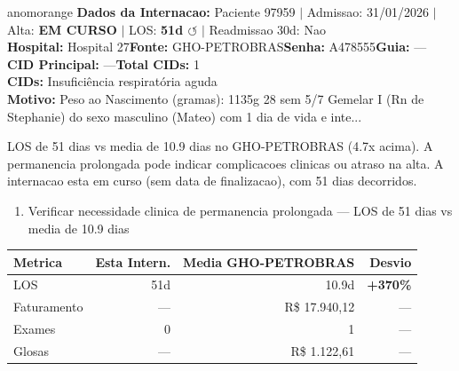 \documentclass[a4paper,10pt]{article}
\begin{document}
\begin{anomalycard}[Internacao 163845 | GHO-PETROBRAS | ALTO (z=4.13)]{anomorange}
\textbf{Dados da Internacao:} Paciente 97959 $\mid$ Admissao: 31/01/2026 $\mid$ Alta: \textcolor{anomorange}{\textbf{EM CURSO}} $\mid$ LOS: \textbf{51d \textcolor{anomorange}{$\circlearrowleft$}} $\mid$ Readmissao 30d: Nao\\
\textbf{Hospital:} Hospital 27\quad\textbf{Fonte:} GHO-PETROBRAS\quad\textbf{Senha:} A478555\quad\textbf{Guia:} ---\\
\textbf{CID Principal:} {\small ---}\quad\textbf{Total CIDs:} 1\\

\textbf{CIDs:} {\scriptsize Insuficiência respiratória aguda}\\

\textbf{Motivo:} {\scriptsize Peso ao Nascimento (gramas): 1135g 28 sem 5/7       Gemelar I (Rn de Stephanie) do sexo masculino (Mateo) com 1 dia de vida e inte...}\\

\vspace{2pt}\begin{tcolorbox}[colback=severityred!20,colframe=anomorange,title={\textbf{Interpretacao de Negocio}},fonttitle=\bfseries\small,left=4pt,right=4pt,top=3pt,bottom=3pt]
{\small LOS de 51 dias vs media de 10.9 dias no GHO-PETROBRAS (4.7x acima). A permanencia prolongada pode indicar complicacoes clinicas ou atraso na alta. A internacao esta em curso (sem data de finalizacao), com 51 dias decorridos.}
\end{tcolorbox}
\begin{tcolorbox}[colback=severityyellow!30,colframe=anomorange,title={\textbf{Recomendacoes Especificas}},fonttitle=\bfseries\small,left=4pt,right=4pt,top=3pt,bottom=3pt]
\begin{enumerate}[nosep,leftmargin=16pt]
\item {\small Verificar necessidade clinica de permanencia prolongada --- LOS de 51 dias vs media de 10.9 dias}
\end{enumerate}
\end{tcolorbox}
\begin{center}\begin{tabular}{l r r r}\toprule\textbf{Metrica} & \textbf{Esta Intern.} & \textbf{Media GHO-PETROBRAS} & \textbf{Desvio} \\\midrule
LOS & 51d & 10.9d & \textcolor{anomred}{\textbf{+370\%}} \\
Faturamento & --- & R\$ 17.940,12 & --- \\
Exames & 0 & 1 & --- \\
Glosas & --- & R\$ 1.122,61 & --- \\
\bottomrule\end{tabular}\end{center}


\end{anomalycard}
\end{document}
